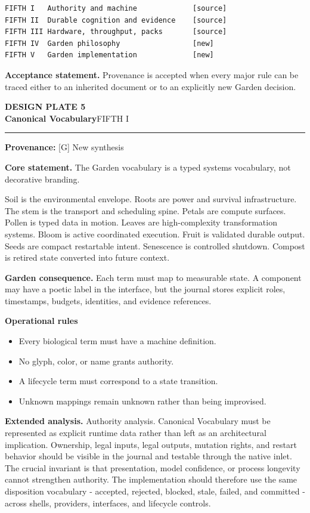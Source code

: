 \documentclass[10pt,letterpaper,oneside]{article}
\newcommand{\prov}[1]{\textcolor{gardenBlue}{\sffamily\footnotesize\textbf{Provenance:} #1}}
\newcommand{\platetitle}[3]{%
  \begin{minipage}[t][0.54in][t]{\textwidth}
  {\sffamily\bfseries\color{gardenDeep}\fontsize{9}{10}\selectfont DESIGN PLATE #1}\\[-1pt]
  {\sffamily\bfseries\color{gardenInk}\fontsize{16.5}{18}\selectfont #2}\hfill{\sffamily\color{gardenGreen}\large #3}
  \end{minipage}\vspace{-2pt}\hrule\vspace{5pt}}
\begin{document}
\begin{lstlisting}
FIFTH I   Authority and machine             [source]
FIFTH II  Durable cognition and evidence    [source]
FIFTH III Hardware, throughput, packs       [source]
FIFTH IV  Garden philosophy                 [new]
FIFTH V   Garden implementation             [new]
\end{lstlisting}
\begin{acceptbox}
\textbf{Acceptance statement.} Provenance is accepted when every major rule can be traced either to an inherited document or to an explicitly new Garden decision.
\end{acceptbox}
\newpage
\platetitle{5}{Canonical Vocabulary}{FIFTH I}
\prov{[G] New synthesis}
\fontsize{8.85}{10.45}\selectfont
\begin{corebox}
\textbf{Core statement.} The Garden vocabulary is a typed systems vocabulary, not decorative branding.
\end{corebox}
Soil is the environmental envelope. Roots are power and survival infrastructure. The stem is the transport and scheduling spine. Petals are compute surfaces. Pollen is typed data in motion. Leaves are high-complexity transformation systems. Bloom is active coordinated execution. Fruit is validated durable output. Seeds are compact restartable intent. Senescence is controlled shutdown. Compost is retired state converted into future context.

\textbf{Garden consequence.} Each term must map to measurable state. A component may have a poetic label in the interface, but the journal stores explicit roles, timestamps, budgets, identities, and evidence references.

\textbf{Operational rules}
\begin{itemize}
\item Every biological term must have a machine definition.
\item No glyph, color, or name grants authority.
\item A lifecycle term must correspond to a state transition.
\item Unknown mappings remain unknown rather than being improvised.
\end{itemize}
\textbf{Extended analysis.} Authority analysis. Canonical Vocabulary must be represented as explicit runtime data rather than left as an architectural implication. Ownership, legal inputs, legal outputs, mutation rights, and restart behavior should be visible in the journal and testable through the native inlet. The crucial invariant is that presentation, model confidence, or process longevity cannot strengthen authority. The implementation should therefore use the same disposition vocabulary - accepted, rejected, blocked, stale, failed, and committed - across shells, providers, interfaces, and lifecycle controls.
\end{document}
